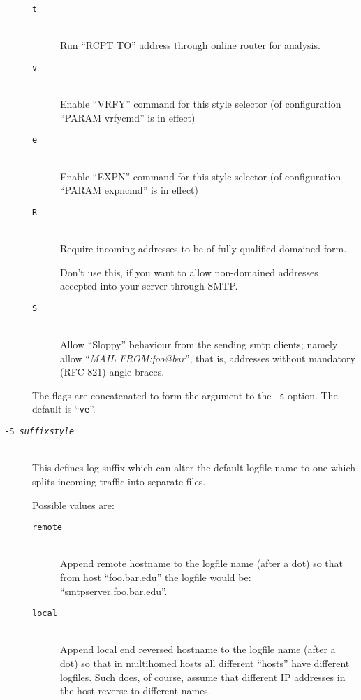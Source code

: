 \begin{description}
\begin{description}
\item[\tt t]\mbox{}\\
Run ``RCPT TO'' address through online router for analysis.

\item[\tt v]\mbox{}\\
Enable ``VRFY'' command for this style selector
(of configuration ``PARAM vrfycmd'' is in effect)

\item[\tt e]\mbox{}\\
Enable ``EXPN'' command for this style selector
(of configuration ``PARAM expncmd'' is in effect)

\item[\tt R]\mbox{}\\
Require incoming addresses to be of fully-qualified domained form.

Don't use this, if you want to allow non-domained addresses accepted
into your server through SMTP.

\item[\tt S]\mbox{}\\
Allow ``Sloppy'' behaviour from the sending smtp clients; namely
allow ``{\em MAIL FROM:foo@bar}'', that is, addresses without
mandatory (RFC-821) angle braces.
\end{description}

The flags are concatenated to form the argument to the {\tt -s} option. 
The default is ``{\tt ve}''.

\item[\tt -S \em suffixstyle] \mbox{} \\
This defines log suffix which can alter the default logfile
name to one which splits incoming traffic into separate files.

Possible values are:
\begin{description}
\item[\tt remote] \mbox{} \\
Append remote hostname to the logfile name (after a dot) so that
from host ``foo.bar.edu'' the logfile would be:
``smtpserver.foo.bar.edu''.
\item[\tt local] \mbox{} \\
Append local end reversed hostname to the logfile name (after a dot)
so that in multihomed hosts all different ``hosts'' have different logfiles.
Such does, of course, assume that different IP addresses in the host reverse
to different names.
\end{description}


\end{description}
